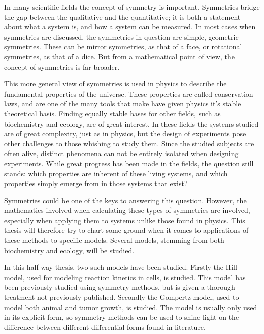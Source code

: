 
In many scientific fields the concept of symmetry is important.
Symmetries bridge the gap between the qualitative and the quantitative; it is both a statement about what a system is, and how a system can be measured.
In most cases when symmetries are discussed, the symmetries in question are simple, geometric symmetries.
These can be mirror symmetries, as that of a face, or rotational symmetries, as that of a dice.
But from a mathematical point of view, the concept of symmetries is far broader.

This more general view of symmetries is used in physics to describe the fundamental properties of the universe.
These properties are called conservation laws, and are one of the many tools that make have given physics it's stable theoretical basis.
Finding equally stable bases for other fields, such as biochemistry and ecology, are of great interest.
In these fields the systems studied are of great complexity, just as in physics, but the design of experiments pose other challenges to those whishing to study them.
Since the studied subjects are often alive, distinct phenomena can not be entirely isolated when designing experiments.
While great progress has been made in the fields, the question still stands: which properties are inherent of these living systems, and which properties simply emerge from in those systems that exist?

Symmetries could be one of the keys to answering this question.
However, the mathematics involved when calculating these types of symmetries are involved, especially when applying them to systems unlike those found in physics.
This thesis will therefore try to chart some ground when it comes to applications of these methods to specific models.
Several models, stemming from both biochemistry and ecology, will be studied.

In this half-way thesis, two such models have been studied.
Firstly the Hill model, used for modeling reaction kinetics in cells, is studied.
This model has been previously studied using symmetry methods, but is given a thorough treatment not previously published.
Secondly the Gompertz model, used to model both animal and tumor growth, is studied.
The model is usually only used in its explicit form, so symmetry methods can be used to shine light on the difference between different differential forms found in literature.
